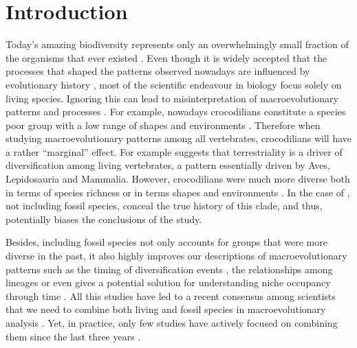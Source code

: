 \chapter{Introduction}
\label{chap:introduction}



%
% 

Today's amazing biodiversity represents only an overwhelmingly small fraction of the organisms that ever existed \citep{novacek1992ext,raup1993extinction}.
Even though it is widely accepted that the processes that shaped the patterns observed nowadays are influenced by evolutionary history \citep{fritzdiversity2013}, most of the scientific endeavour in biology focus solely on living species.
Ignoring this can lead to misinterpretation of macroevolutionary patterns and processes \citep{benton2015}.
For example, nowadays crocodilians constitute a species poor group \citep[25 species;][]{uetz2010original} with a low range of shapes and environments \citep[marine or freshwater;][]{Martin2008}.
Therefore when studying macroevolutionary patterns among all vertebrates, crocodilians will have a rather ``marginal'' effect.
For example \cite{Wiens2015} suggests that terrestriality is a driver of diversification among living vertebrates, a pattern essentially driven by Aves, Lepidosauria and Mammalia.
However, crocodilians were much more diverse both in terms of species richness \citep[244 species reported in][]{Bronzati2015} or in terms shapes and environments \citep{stubbs2013}.
In the case of \cite{Wiens2015}, not including fossil species, conceal the true history of this clade, and thus, potentially biases the conclusions of the study.

Besides, including fossil species not only accounts for groups that were more diverse in the past, it also highly improves our descriptions of macroevolutionary patterns such as the timing of diversification events \citep[e.g. significantly reducing node age confidence intervals;][]{ronquista2012}, the relationships among lineages \citep[e.g. solving some controversial fossil placement;][]{Dembo2015} or even gives a potential solution for understanding niche occupancy through time \citep[e.g.][]{pearmanniche2008}.
All this studies have led to a recent consensus among scientists that we need to combine both living and fossil species in macroevolutionary analysis \citep{jacksonwhat2006,quentaldiversity2010,dietlconservation2011,slaterunifying2013,fritzdiversity2013,benton2015}.
Yet, in practice, only few studies have actively focused on combining them since the last three years \citep[e.g.][]{ronquista2012,slaterphylogenetic2013,Wood01032013,beckancient2014,Arcila2015131,Dembo2015}. %

